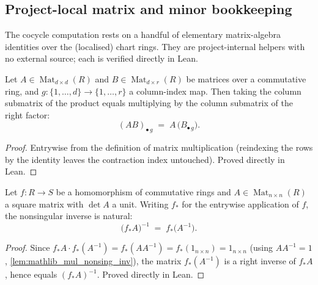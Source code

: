 \subsection*{Project-local matrix and minor bookkeeping}

The cocycle computation rests on a handful of elementary matrix-algebra
identities over the (localised) chart rings. They are project-internal helpers
with no external source; each is verified directly in Lean.

\begin{lemma}\leanok
  \label{lem:gr_mul_submatrix_col}
  Let \(A \in \operatorname{Mat}_{d\times d}(R)\) and
  \(B \in \operatorname{Mat}_{d\times r}(R)\) be matrices over a commutative ring,
  and \(g : \{1,\dots,d\} \to \{1,\dots,r\}\) a column-index map. Then taking the
  column submatrix of the product equals multiplying by the column submatrix of
  the right factor:
  \[
    (A B)_{\bullet\, g} \;=\; A \,\bigl(B_{\bullet\, g}\bigr).
  \]
\end{lemma}
\begin{proof}

\leanok
  Entrywise from the definition of matrix multiplication (reindexing the rows by
  the identity leaves the contraction index untouched). Proved directly in Lean.
\end{proof}

\begin{lemma}\leanok
  \label{lem:gr_map_nonsing_inv}
  Let \(f : R \to S\) be a homomorphism of commutative rings and
  \(A \in \operatorname{Mat}_{n\times n}(R)\) a square matrix with \(\det A\) a
  unit. Writing \(f_\ast\) for the entrywise application of \(f\), the
  nonsingular inverse is natural:
  \[
    \bigl(f_\ast A\bigr)^{-1} \;=\; f_\ast\bigl(A^{-1}\bigr).
  \]
\end{lemma}
\begin{proof}

\leanok
  Since \(f_\ast A \cdot f_\ast(A^{-1}) = f_\ast(A A^{-1}) = f_\ast(1_{n\times n})
  = 1_{n\times n}\) (using \(A A^{-1} = 1\), \cref{lem:mathlib_mul_nonsing_inv}),
  the matrix \(f_\ast(A^{-1})\) is a right inverse of \(f_\ast A\), hence equals
  \((f_\ast A)^{-1}\). Proved directly in Lean.
\end{proof}

